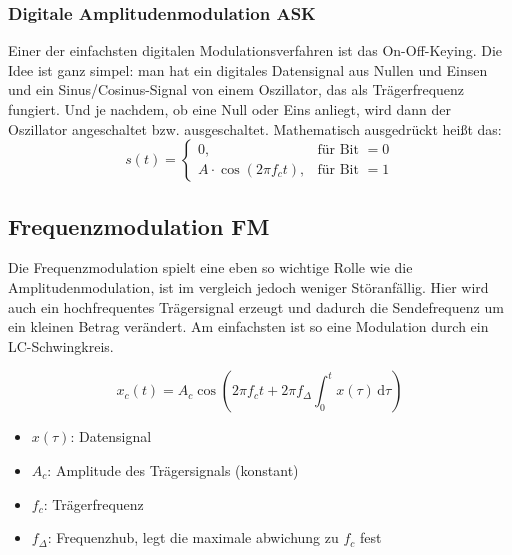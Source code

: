 \subsubsection{Digitale Amplitudenmodulation ASK}
Einer der einfachsten digitalen Modulationsverfahren ist 
das On-Off-Keying. 
Die Idee ist ganz simpel: man hat ein digitales Datensignal aus Nullen und Einsen
und ein Sinus/Cosinus-Signal von einem Oszillator, das als Trägerfrequenz fungiert.
Und je nachdem, ob eine Null oder Eins anliegt, wird dann der Oszillator angeschaltet bzw. ausgeschaltet.
Mathematisch ausgedrückt heißt das:
\begin{equation}
s(t) =
\begin{cases}
0, & \text{für Bit } = 0 \\
A \cdot \cos(2 \pi f_c t), & \text{für Bit } = 1
\end{cases}
\end{equation}




\subsection{Frequenzmodulation FM}
Die Frequenzmodulation spielt eine eben so wichtige Rolle wie die Amplitudenmodulation,
ist im vergleich jedoch weniger Störanfällig. 
Hier wird auch ein hochfrequentes Trägersignal erzeugt und dadurch die Sendefrequenz um ein kleinen Betrag verändert.
Am einfachsten ist so eine Modulation durch ein LC-Schwingkreis.

\begin{equation}
x_c(t) = A_c \cos\left( 2\pi f_c t + 2\pi f_\Delta \int_0^t x(\tau) \, \mathrm{d}\tau \right)
\end{equation}
\begin{itemize}
    \item $x(\tau)$: Datensignal
    \item $A_c$: Amplitude des Trägersignals (konstant)
    \item $f_c$: Trägerfrequenz 
    \item $f_\Delta$: Frequenzhub, legt die maximale abwichung zu $f_c$ fest
\end{itemize}
\clearpage

